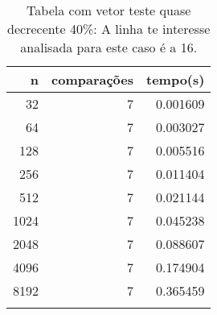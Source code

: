 \begin{table}[ht]
\centering
\begin{tabular}{rrr} \toprule
        n &    comparações &       tempo(s) \\ \midrule
      32  &              7 &      0.001609 \\
      64  &              7 &      0.003027 \\
     128  &              7 &      0.005516 \\
     256  &              7 &      0.011404 \\
     512  &              7 &      0.021144 \\
    1024  &              7 &      0.045238 \\
    2048  &              7 &      0.088607 \\
    4096  &              7 &      0.174904 \\
    8192  &              7 &      0.365459 \\
\bottomrule\addlinespace
\end{tabular}
\caption{Tabela com vetor teste quase decrecente 40\%: A linha te interesse analisada para este caso é a 16.}
\label{tab:radixsortQuaseDecresc40}
\end{table}

